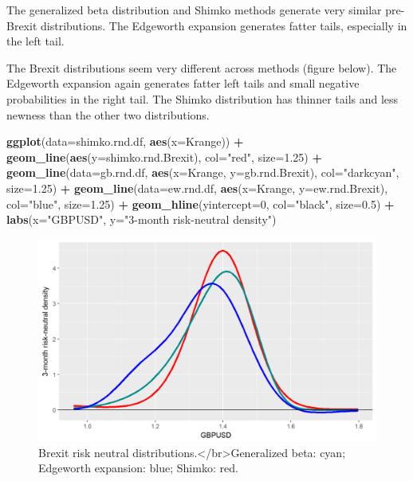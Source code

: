 \documentclass[]{book}
\newenvironment{Shaded}{\begin{snugshade}}{\end{snugshade}}
\newcommand{\KeywordTok}[1]{\textcolor[rgb]{0.13,0.29,0.53}{\textbf{#1}}}
\newcommand{\DataTypeTok}[1]{\textcolor[rgb]{0.13,0.29,0.53}{#1}}
\newcommand{\DecValTok}[1]{\textcolor[rgb]{0.00,0.00,0.81}{#1}}
\newcommand{\FloatTok}[1]{\textcolor[rgb]{0.00,0.00,0.81}{#1}}
\newcommand{\StringTok}[1]{\textcolor[rgb]{0.31,0.60,0.02}{#1}}
\newcommand{\OperatorTok}[1]{\textcolor[rgb]{0.81,0.36,0.00}{\textbf{#1}}}
\newcommand{\NormalTok}[1]{#1}
\theoremstyle{definition}
\theoremstyle{definition}
\theoremstyle{definition}
\theoremstyle{remark}
\begin{document}
The generalized beta distribution and Shimko methods generate very
similar pre-Brexit distributions. The Edgeworth expansion generates
fatter tails, especially in the left tail.

The Brexit distributions seem very different across methods (figure
below). The Edgeworth expansion again generates fatter left tails and
small negative probabilities in the right tail. The Shimko distribution
has thinner tails and less newness than the other two distributions.

\begin{Shaded}
\begin{Highlighting}[]
\KeywordTok{ggplot}\NormalTok{(}\DataTypeTok{data=}\NormalTok{shimko.rnd.df, }\KeywordTok{aes}\NormalTok{(}\DataTypeTok{x=}\NormalTok{Krange)) }\OperatorTok{+}\StringTok{ }
\StringTok{  }\KeywordTok{geom_line}\NormalTok{(}\KeywordTok{aes}\NormalTok{(}\DataTypeTok{y=}\NormalTok{shimko.rnd.Brexit), }\DataTypeTok{col=}\StringTok{"red"}\NormalTok{, }\DataTypeTok{size=}\FloatTok{1.25}\NormalTok{) }\OperatorTok{+}
\StringTok{  }\KeywordTok{geom_line}\NormalTok{(}\DataTypeTok{data=}\NormalTok{gb.rnd.df, }\KeywordTok{aes}\NormalTok{(}\DataTypeTok{x=}\NormalTok{Krange, }\DataTypeTok{y=}\NormalTok{gb.rnd.Brexit), }\DataTypeTok{col=}\StringTok{"darkcyan"}\NormalTok{, }\DataTypeTok{size=}\FloatTok{1.25}\NormalTok{) }\OperatorTok{+}
\StringTok{  }\KeywordTok{geom_line}\NormalTok{(}\DataTypeTok{data=}\NormalTok{ew.rnd.df, }\KeywordTok{aes}\NormalTok{(}\DataTypeTok{x=}\NormalTok{Krange, }\DataTypeTok{y=}\NormalTok{ew.rnd.Brexit), }\DataTypeTok{col=}\StringTok{"blue"}\NormalTok{, }\DataTypeTok{size=}\FloatTok{1.25}\NormalTok{) }\OperatorTok{+}
\StringTok{  }\KeywordTok{geom_hline}\NormalTok{(}\DataTypeTok{yintercept=}\DecValTok{0}\NormalTok{, }\DataTypeTok{col=}\StringTok{"black"}\NormalTok{, }\DataTypeTok{size=}\FloatTok{0.5}\NormalTok{) }\OperatorTok{+}
\StringTok{  }\KeywordTok{labs}\NormalTok{(}\DataTypeTok{x=}\StringTok{"GBPUSD"}\NormalTok{, }\DataTypeTok{y=}\StringTok{"3-month risk-neutral density"}\NormalTok{) }
\end{Highlighting}
\end{Shaded}

\begin{figure}
\includegraphics[width=1\linewidth]{images/unnamed-chunk-67-1} \caption{Brexit risk neutral distributions.</br>Generalized beta: cyan; Edgeworth expansion: blue; Shimko: red.}\label{fig:unnamed-chunk-67}
\end{figure}
\end{document}
